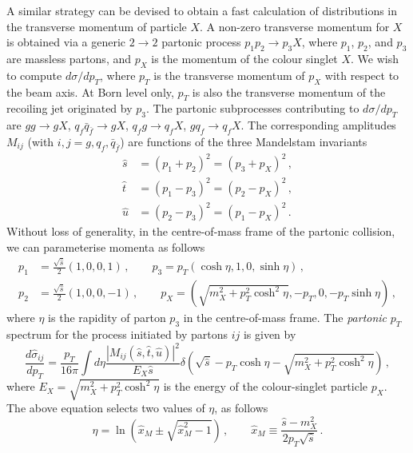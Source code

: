 \documentclass[12pt]{article}
\begin{document}
A similar strategy can be devised to obtain a fast calculation of
distributions in the transverse momentum of particle $X$. A non-zero
transverse momentum for $X$ is obtained via a generic $2\to 2$
partonic process $p_1 p_2 \to p_3 X$, where $p_1$, $p_2$, and $p_3$ are massless
partons, and $p_X$ is the momentum of the colour singlet $X$. We
wish to compute $d\sigma/dp_T$, where $p_T$ is the transverse momentum
of $p_X$ with respect to the beam axis. At Born level only, $p_T$ is
also the transverse momentum of the recoiling jet originated by
$p_3$. The partonic subprocesses contributing to $d\sigma/dp_T$ are
$gg\to g X$, $q_f \bar q_{\bar f} \to g X$, $q_f g\to q_f X$,
$gq_f \to q_fX$. The corresponding amplitudes $M_{ij}$ (with
$i,j=g,q_f,\bar q_{\bar f}$) are functions of the three Mandelstam
invariants
\begin{equation}
  \label{eq:Mandelstam}
  \begin{split}
  \hat s & = (p_1+p_2)^2 = (p_3+p_X)^2 \,,\\
  \hat t & = (p_1-p_3)^2 = (p_2-p_X)^2 \,,\\
  \hat u & = (p_2-p_3)^2 = (p_1-p_X)^2 \,.
  \end{split}
\end{equation}
Without loss of generality, in the centre-of-mass frame of the
partonic collision, we can parameterise momenta as follows
\begin{equation}
  \label{eq:momenta}
  \begin{split}
  p_1&=\frac{\sqrt {\hat s}}{2}(1,0,0,1)\,,\qquad p_3 = p_T(\cosh\eta,1,0,\sinh\eta)\,,\\
  p_2&=\frac{\sqrt {\hat s}}{2}(1,0,0,-1)\,,\qquad p_X = \left ( \sqrt{m_X^2+p^2_T\cosh^2\eta},-p_T,0,-p_T \sinh\eta \right ) \,,
  \end{split}
\end{equation}
where $\eta$ is the rapidity of parton $p_3$ in the
centre-of-mass frame. The {\em partonic} $p_T$ spectrum for the
process initiated by partons $ij$ is given by
\begin{equation}
  \label{eq:partonic-pt}
  \frac{d\hat \sigma_{ij}}{dp_T} = \frac{p_T}{16\pi}\int d\eta \frac{|M_{ij}(\hat s,\hat t,\hat u)|^2}{E_X \hat s} \delta\left(\sqrt{\hat s} - p_T\cosh\eta-\sqrt{m_X^2+p^2_T\cosh^2\eta}\right)\,, 
\end{equation}
where $E_X=\sqrt{m_X^2+p^2_T\cosh^2\eta}$ is the energy of the colour-singlet
particle $p_X$.  The above equation selects two values of $\eta$, as
follows
\begin{equation}
\label{eq:eta-values}
  \eta = \ln\left(\hat x_M \pm \sqrt{\hat x_M^2-1}\right)\,,\qquad \hat x_M\equiv\frac{\hat s-m_X^2}{2 p_T \sqrt{\hat s} }\,.
\end{equation}
\end{document}
